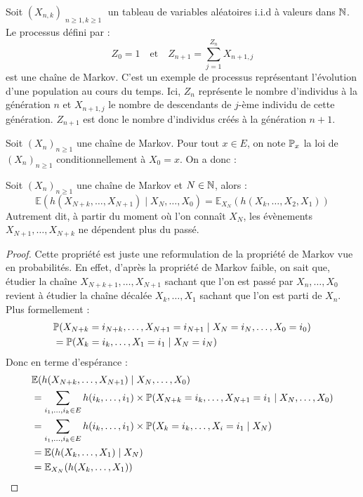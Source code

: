 \begin{example}
    Soit $(X_{n, k})_{\substack{n \geqslant 1, k \geqslant 1}}$ un tableau de variables 
    aléatoires i.i.d à valeurs dans $\mathbb{N}$. Le processus défini par : 
        $$ Z_0 = 1 \quad \text{et} \quad Z_{n+1} = \sum_{j=1}^{Z_n} X_{n+1, j}  $$
    est une chaîne de Markov. C'est un exemple de processus représentant l'évolution d'une population 
    au cours du temps. Ici, $Z_n$ représente le nombre d'individus à la génération $n$ et $X_{n+1, j}$ le nombre 
    de descendants de $j$-ème individu de cette génération. 
    $Z_{n+1}$ est donc le nombre d'individus créés à la génération $n+1$. 
\end{example}

Soit $(X_n)_{n \geqslant 1}$ une chaîne de Markov. Pour tout $x \in E$, on note $ \mathbb{P}_x$ la loi de 
$(X_n)_{n \geqslant 1}$ conditionnellement à $X_0 = x$. On a donc : 

\begin{prop}
    Soit  $(X_n)_{n \geqslant 1}$ une chaîne de Markov et $N \in \mathbb{N}$, alors : 
        $$ \mathbb{E}(h(X_{N+k},\dots, X_{N+1}) \; | \; X_N, \dots, X_0) 
        = \mathbb{E}_{X_N}(h(X_k, \dots, X_2, X_1)) $$ 
    Autrement dit, à partir du moment où l'on connaît $X_N$, les évènements $X_{N + 1}, \dots, X_{N +k}$ ne dépendent 
    plus du passé. 
\end{prop}

\begin{proof}
    Cette propriété est juste une reformulation de la propriété de Markov vue en probabilités. 
    En effet, d'après la propriété de Markov faible, on sait que, étudier la chaîne $X_{N+k+1}, \dots, X_{N+1}$ 
    sachant que l'on est passé par $ X_n, \dots, X_0$ revient à étudier la chaîne décalée 
    $ X_k, \dots, X_1$ sachant que l'on est parti de $X_n$. Plus formellement : 
        \begin{align*}
            & \mathbb{P}(X_{N+k} = i_{N+k}, \dots, X_{N+1} = i_{N+1} \; | \; X_N = i_N, \dots, X_0 = i_0) \\
            &=  \mathbb{P}(X_k = i_k, \dots, X_1 = i_1 \; | \; X_N = i_N)
        \end{align*} 
    Donc en terme d'espérance : 
        \begin{align*}
            & \mathbb{E}(h(X_{N+k}, \dots, X_{N+1}) \; | \; X_N, \dots, X_0) \\ 
            &= \sum_{i_1, \dots, i_k \in E} h(i_k, \dots, i_1) \times \mathbb{P}(X_{N+k} = i_k, \dots, X_{N+1} = i_1 \; | \; X_N, \dots, X_0) \\
            &= \sum_{i_1, \dots, i_k \in E} h(i_k, \dots, i_1) \times \mathbb{P}(X_k = i_k, \dots, X_i = i_1 \; | \; X_N) \\ 
            &= \mathbb{E}(h(X_k, \dots, X_1) \; | \; X_N) \\
            &= \mathbb{E}_{X_N}(h(X_k, \dots, X_1)) 
        \end{align*}
\end{proof}

